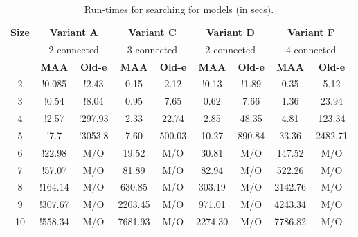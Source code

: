 \begin{table}[t]
  \centering
  \begin{tabular}[t]{|c|c|c|c|c|c|c|c|c|}\hline
  
    {\multirow{2}{*} {\textbf{Size}}}  & \multicolumn{2}{c|}{\textbf{Variant A}} & \multicolumn{2}{c|}{\textbf{Variant C}} & \multicolumn{2}{c|}{\textbf{Variant D}}  &  \multicolumn{2}{c|}{\textbf{Variant F}} \\\cline{2-9}
  
   {} & \multicolumn{2}{c|}{2-connected} & \multicolumn{2}{c|}{3-connected} & \multicolumn{2}{c|}{2-connected}  &  \multicolumn{2}{c|}{4-connected}
   \\\cline{2-9}
    {} & {\textbf{MAA}} & {\textbf{Old-e}} & {\textbf{MAA}} & {\textbf{Old-e}} & {\textbf{MAA}} & {\textbf{Old-e}} & {\textbf{MAA}} & {\textbf{Old-e}} \\\hline
    2 & !0.085 & !2.43 & 0.15 & 2.12 & !0.13 & !1.89 & 0.35 & 5.12 \\\hline
    3 & !0.54 & !8.04 & 0.95  & 7.65 & 0.62 & 7.66  & 1.36 & 23.94\\\hline
    4 & !2.57 & !297.93 & 2.33 & 22.74 & 2.85 & 48.35  & 4.81 & 123.34\\\hline
    5 & !7.7 & !3053.8 & 7.60 & 500.03 & 10.27 & 890.84 & 33.36  & 2482.71 \\\hline
    6 & !22.98 & M/O & 19.52 & M/O & 30.81 & M/O  & 147.52 & M/O\\\hline
    7 & !57.07 & M/O & 81.89 & M/O & 82.94 & M/O & 522.26  & M/O \\\hline
    8 & !164.14 & M/O & 630.85 & M/O & 303.19 & M/O & 2142.76 & M/O\\\hline
    9 & !307.67 & M/O & 2203.45 & M/O & 971.01 & M/O & 4243.34 & M/O\\\hline
    10 & !558.34 & M/O & 7681.93 & M/O & 2274.30 & M/O & 7786.82 & M/O\\\hline
  \end{tabular}
  \caption{Run-times for searching for models (in secs).}
  \label{tab:qf-grabh}
\end{table}

